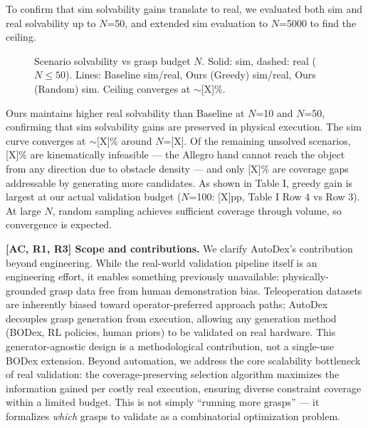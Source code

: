 \documentclass[conference]{IEEEtran}
\newcommand{\rone}{{\color{R1}R1}}
\newcommand{\rtwo}{{\color{R2}R2}}
\newcommand{\rthree}{{\color{R3}R3}}
\newcommand{\acmark}{{\color{AC}AC}}
\newcommand{\rssparagraph}[1]{{\bf #1.}}
\begin{document}
\noindent[\rtwo] To confirm that sim solvability gains translate to real, we evaluated both sim and real solvability up to $N$=50, and extended sim evaluation to $N$=5000 to find the ceiling.

\begin{figure}[h]
\centering
\caption{Scenario solvability vs grasp budget $N$. Solid: sim, dashed: real ($N \leq 50$). Lines: Baseline sim/real, Ours (Greedy) sim/real, Ours (Random) sim. Ceiling converges at $\sim$[X]\%.}
\label{fig:solvability_curve}
\end{figure}

\noindent[\rtwo] Ours maintains higher real solvability than Baseline at $N$=10 and $N$=50, confirming that sim solvability gains are preserved in physical execution.
The sim curve converges at $\sim$[X]\% around $N$=[X]. Of the remaining unsolved scenarios, [X]\% are kinematically infeasible --- the Allegro hand cannot reach the object from any direction due to obstacle density --- and only [X]\% are coverage gaps addressable by generating more candidates.
As shown in Table I, greedy gain is largest at our actual validation budget ($N$=100: [X]pp, Table I Row 4 vs Row 3). At large $N$, random sampling achieves sufficient coverage through volume, so convergence is expected.

\rssparagraph{[\acmark, \rone, \rthree] Scope and contributions}
\noindent[\acmark, \rthree] We clarify AutoDex's contribution beyond engineering. While the real-world validation pipeline itself is an engineering effort, it enables something previously unavailable: physically-grounded grasp data free from human demonstration bias. Teleoperation datasets are inherently biased toward operator-preferred approach paths; AutoDex decouples grasp generation from execution, allowing any generation method (BODex, RL policies, human priors) to be validated on real hardware. This generator-agnostic design is a methodological contribution, not a single-use BODex extension.
Beyond automation, we address the core scalability bottleneck of real validation: the coverage-preserving selection algorithm maximizes the information gained per costly real execution, ensuring diverse constraint coverage within a limited budget. This is not simply ``running more grasps'' --- it formalizes \emph{which} grasps to validate as a combinatorial optimization problem.
\end{document}
